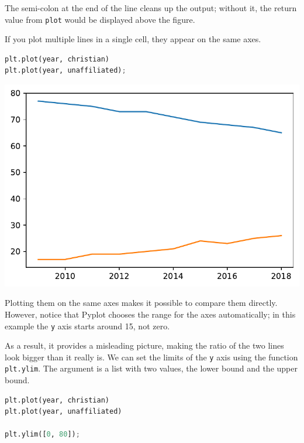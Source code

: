 The semi-colon at the end of the line cleans up the output; without it,
the return value from \passthrough{\lstinline!plot!} would be displayed
above the figure.

If you plot multiple lines in a single cell, they appear on the same
axes.

\begin{lstlisting}[language=Python]
plt.plot(year, christian)
plt.plot(year, unaffiliated);
\end{lstlisting}

\begin{center}
\includegraphics[scale=0.75]{chapters/06_plotting_files/06_plotting_27_0.pdf}
\end{center}

Plotting them on the same axes makes it possible to compare them
directly. However, notice that Pyplot chooses the range for the axes
automatically; in this example the \passthrough{\lstinline!y!} axis
starts around 15, not zero.

As a result, it provides a misleading picture, making the ratio of the
two lines look bigger than it really is. We can set the limits of the
\passthrough{\lstinline!y!} axis using the function
\passthrough{\lstinline!plt.ylim!}. The argument is a list with two
values, the lower bound and the upper bound.

\begin{lstlisting}[language=Python]
plt.plot(year, christian)
plt.plot(year, unaffiliated)

plt.ylim([0, 80]);
\end{lstlisting}


